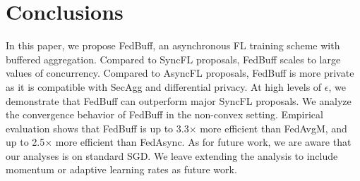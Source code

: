 \documentclass[twoside]{article}
\newcommand{\algname}{{FedBuff}\xspace}
\newcommand{\asyncfl}{{AsyncFL}\xspace}
\newcommand{\syncfl}{{SyncFL}\xspace}
\begin{document}






\section{Conclusions}
\label{sec:conclusions}
In this paper, we propose \algname{}, an asynchronous FL training scheme with buffered aggregation. Compared to \syncfl proposals, \algname{} scales to large values of concurrency. Compared to \asyncfl proposals, \algname{} is more private as it is compatible with SecAgg and differential privacy. At high levels of $\epsilon$, we demonstrate that \algname can outperform major \syncfl proposals.
We analyze the convergence behavior of \algname{} in the non-convex setting. Empirical evaluation shows that \algname{} is up to 3.3$\times$ more efficient than FedAvgM, and up to 2.5$\times$ more efficient than FedAsync. As for future work, we are aware that our analyses is on standard SGD. We leave extending the analysis to include momentum or adaptive learning rates as future work. 
\end{document}
